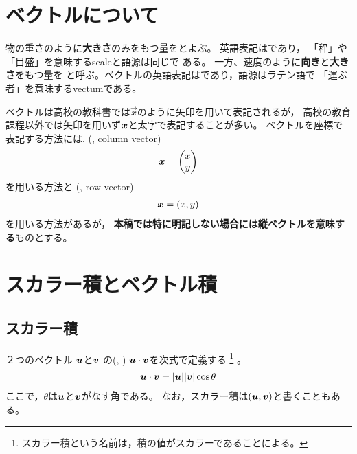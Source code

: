\documentclass[twocolumn,11pt]{jarticle}
\begin{document}
\pagestyle{empty}
\newpage

\setcounter{page}{1}
\pagestyle{fancy}

\section{ベクトルについて}
物の重さのように\textbf{大きさ}のみをもつ量をとよぶ。
英語表記はであり，
「秤」や「目盛」を意味するscaleと語源は同じで
ある。
一方、速度のように\textbf{向き}と\textbf{大きさ}をもつ量を
と呼ぶ。ベクトルの英語表記はであり，語源はラテン語で
「運ぶ者」を意味するvectumである。

ベクトルは高校の教科書では$\vec{x}$のように矢印を用いて表記されるが，
高校の教育課程以外では矢印を用いず$\boldsymbol{x}$と太字で表記することが多い。
ベクトルを座標で表記する方法には, 
(, column vector)
\begin{align}
\boldsymbol{x}=
\begin{pmatrix}
x\\y  
\end{pmatrix}\notag
\end{align}
を用いる方法と
(, row vector)
\begin{align}
\boldsymbol{x}=(x,y)\notag
\end{align}
を用いる方法があるが，
\textbf{本稿では特に明記しない場合には縦ベクトルを意味する}ものとする。

\section{スカラー積とベクトル積}

\subsection{スカラー積\label{sec:scalar-product}}
２つのベクトル
$\boldsymbol{u}$と$\boldsymbol{v}$
の(,
)
$\boldsymbol{u}\cdot\boldsymbol{v}$を次式で定義する
\footnote{スカラー積という名前は，積の値がスカラーであることによる。}
。
\begin{align}
  \boldsymbol{u}\cdot\boldsymbol{v}=|\boldsymbol{u}||\boldsymbol{v}|\cos\theta\notag
\end{align}
ここで，$\theta$は$\boldsymbol{u}$と$\boldsymbol{v}$がなす角である。
なお，スカラー積は$(\boldsymbol{u},\boldsymbol{v})$と書くこともある。
\end{document}
